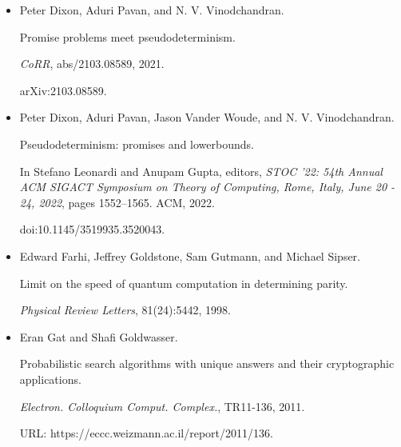 \documentclass[10pt,a4paper]{article}
\begin{document}
\begin{itemize}
Andrew M. Childs and Jason M. Eisenberg.


Quantum algorithms for subset finding.


\emph{Quantum Inf. Comput.}, 5(7):593–604, 2005.


doi:10.26421/QIC5.7-7.





\item[] 
[10]

Peter Dixon, Aduri Pavan, and N. V. Vinodchandran.


Promise problems meet pseudodeterminism.


\emph{CoRR}, abs/2103.08589, 2021.


arXiv:2103.08589.





\item[] 
[11]

Peter Dixon, Aduri Pavan, Jason Vander Woude, and N. V. Vinodchandran.


Pseudodeterminism: promises and lowerbounds.


In Stefano Leonardi and Anupam Gupta, editors, \emph{STOC ’22: 54th
Annual ACM SIGACT Symposium on Theory of Computing, Rome, Italy, June 20
- 24, 2022}, pages 1552–1565. ACM, 2022.


doi:10.1145/3519935.3520043.





\item[] 
[12]

Edward Farhi, Jeffrey Goldstone, Sam Gutmann, and Michael Sipser.


Limit on the speed of quantum computation in determining parity.


\emph{Physical Review Letters}, 81(24):5442, 1998.





\item[] 
[13]

Eran Gat and Shafi Goldwasser.


Probabilistic search algorithms with unique answers and their
cryptographic applications.


\emph{Electron. Colloquium Comput. Complex.}, TR11-136, 2011.


URL: https://eccc.weizmann.ac.il/report/2011/136.






\end{itemize}
\end{document}
